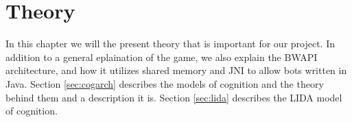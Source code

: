 
\chapter{Theory}
In this chapter we will the present theory that is important for our project. In addition to a general eplaination of the game, we also explain the BWAPI architecture, and how it utilizes shared memory and JNI to allow bots written in Java. Section \ref{sec:cogarch} describes the models of cognition and the theory behind them and a description it is. Section \ref{sec:lida} describes the LIDA model of cognition.


